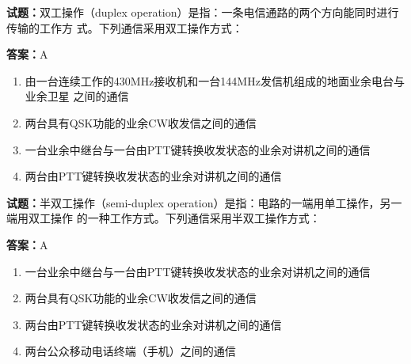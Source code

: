 \documentclass{ctexbook}
\begin{document}




\vspace{1em}

\textbf{试题：}双工操作（duplex operation）是指：一条电信通路的两个方向能同时进行传输的工作方
式。下列通信采用双工操作方式： 

\textbf{答案：}A 

\begin{enumerate}[leftmargin=3em]
  \item 由一台连续工作的430MHz接收机和一台144MHz发信机组成的地面业余电台与业余卫星
之间的通信 

  \item 两台具有QSK功能的业余CW收发信之间的通信 

  \item 一台业余中继台与一台由PTT键转换收发状态的业余对讲机之间的通信 

  \item 两台由PTT键转换收发状态的业余对讲机之间的通信 

\end{enumerate}





\vspace{1em}

\textbf{试题：}半双工操作（semi-duplex operation）是指：电路的一端用单工操作，另一端用双工操作
的一种工作方式。下列通信采用半双工操作方式： 

\textbf{答案：}A 

\begin{enumerate}[leftmargin=3em]
  \item 一台业余中继台与一台由PTT键转换收发状态的业余对讲机之间的通信 

  \item 两台具有QSK功能的业余CW收发信之间的通信 

  \item 两台由PTT键转换收发状态的业余对讲机之间的通信 

  \item 两台公众移动电话终端（手机）之间的通信 


\end{enumerate}



\end{document}
